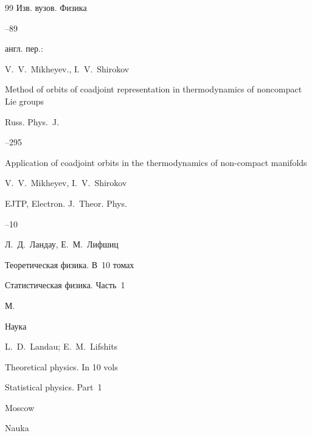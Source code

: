\begin{thebibliography}{99}
\jour Изв. вузов. Физика




–89


\transl англ. пер.:~

\by  V.~V.~Mikheyev., I.~V.~Shirokov

\paper Method of orbits of coadjoint representation in thermodynamics of noncompact Lie groups

\jour Russ. Phys.~J.



--295 





\paper Application of coadjoint orbits in the thermodynamics of non-compact manifolds

\by   V.~V.~Mikheyev, I.~V.~Shirokov

\jour EJTP, Electron. J.~Theor. Phys.




--10






\by Л.~Д.~Ландау, Е.~М.~Лифшиц

\book Теоретическая физика. В~10 томах


\volinfo Статистическая физика. Часть~1

\publaddr М.

\publ Наука



\misctransl

\by L.~D.~Landau; E.~M.~Lifshits

\book Theoretical physics. In 10 vols


\volinfo Statistical physics. Part~1

\publaddr Moscow

\publ Nauka



\end{thebibliography}
